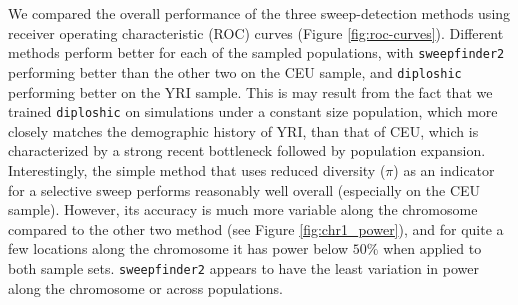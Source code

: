 \documentclass[hidelinks]{article}
\newcommand{\sweepfinder}{\texttt{sweepfinder2}\xspace}
\newcommand{\diploshic}{\texttt{diploshic}\xspace}
\newcommand{\drscomment}[1]{\textcolor{purple}{DRS: #1}}
\begin{document}
    We compared the overall performance of the three sweep-detection methods using
    receiver operating characteristic (ROC) curves (Figure \ref{fig:roc-curves}).
    Different methods perform better for each of the sampled populations,
    with \sweepfinder performing better than the other two on the CEU sample,
    and \diploshic performing better on the YRI sample.
    This is may result from the fact that we trained \diploshic on simulations under a constant size population,
    which more closely matches the demographic history of YRI, than that of CEU, which 
    is characterized by a strong recent bottleneck followed by population expansion.
    Interestingly, the simple method that uses reduced diversity ($\pi$) as an indicator
    for a selective sweep performs reasonably well overall (especially on the CEU sample).
    However, its accuracy is much more variable along the chromosome compared to the other two method (see Figure \ref{fig:chr1_power}),
    and for quite a few locations along the chromosome it has power below $50\%$
    when applied to both sample sets.
    \sweepfinder appears to have the least variation in power along the chromosome or across populations.
\end{document}
